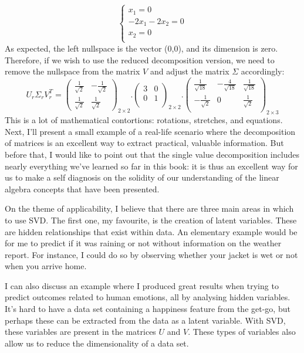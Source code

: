 \documentclass[a4,12pt,twosided,openany]{memoir}
\begin{document}
\[
    \begin{cases}
      x_1 = 0\\
      -2x_1 - 2x_2 = 0\\
      x_2 = 0\\
    \end{cases}
\]
As expected, the left nullspace is the vector (0,0), and its dimension is zero. Therefore, if we wish to use the reduced decomposition version, we need to  remove the nullspace from the matrix $V$ and adjust the matrix $\Sigma$ accordingly:
\[U_r \Sigma_r V^T_r = \begin{pmatrix}
\frac{1}{\sqrt{2}} & -\frac{1}{\sqrt{2}} \\
\frac{1}{\sqrt{2}} & \frac{1}{\sqrt{2}}
\end{pmatrix}_{2 \times 2}.\begin{pmatrix}
3 & 0 \\
0 & 1  \\
\end{pmatrix}_{2\times 2}.
\begin{pmatrix}
\frac{1}{\sqrt{18}} &-\frac{4}{\sqrt{18}} & \frac{1}{\sqrt{18}}\\
 -\frac{1}{\sqrt{2}}   & 0 & \frac{1}{\sqrt{2}} \\
\end{pmatrix}_{2 \times 3}
\]
\indent
This is a lot of mathematical contortions: rotations, stretches, and equations. Next, I’ll present a small example of a real-life scenario where the decomposition of matrices is an excellent way to extract practical, valuable information. But before that, I would like to point out that the single value decomposition includes nearly everything we’ve learned so far in this book: it is thus an excellent way for us to make a self diagnosis on the solidity of our understanding of the linear algebra concepts that have been presented. 
\par 
\indent
On the theme of applicability, I believe that there are three main areas in which to use SVD. The first one, my favourite, is the creation of latent variables. These are hidden relationships that exist within data. An elementary example would be for me to predict if it was raining or not without information on the weather report. For instance, I could do so by observing whether your jacket is wet or not when you arrive home. 
\par 
\indent
I can also discuss an example where I produced great results when trying to predict outcomes related to human emotions, all by analysing hidden variables. It’s hard to have a data set containing a happiness feature from the get-go, but perhaps these can be extracted from the data as a latent variable. With SVD, these variables are present in the matrices $U$ and $V$. These types of variables also allow us to reduce the dimensionality of a data set.
\end{document}

